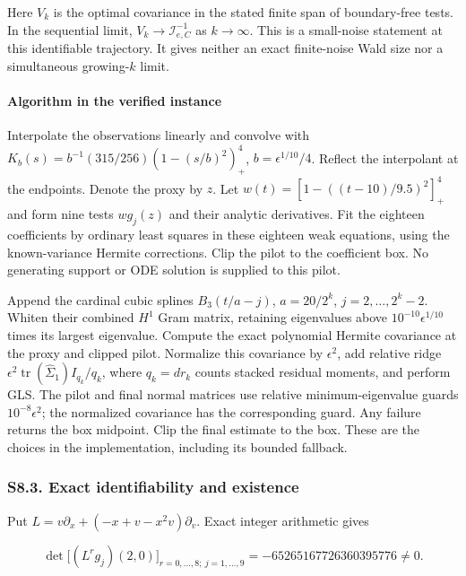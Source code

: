 \documentclass[
  american,
  11pt,
]{article}
\begin{document}
Here \(V_k\) is the optimal covariance in the stated finite span of
boundary-free tests. In the sequential limit,
\(V_k\to\mathcal I_{e,C}^{-1}\) as \(k\to\infty\). This is a small-noise
statement at this identifiable trajectory. It gives neither an exact
finite-noise Wald size nor a simultaneous growing-\(k\) limit.

\paragraph{Algorithm in the verified
instance}\label{algorithm-in-the-verified-instance}

Interpolate the observations linearly and convolve with
\(K_b(s)=b^{-1}(315/256)(1-(s/b)^2)_+^4\), \(b=\epsilon^{1/10}/4\).
Reflect the interpolant at the endpoints. Denote the proxy by \(z\). Let
\(w(t)=[1-((t-10)/9.5)^2]_+^4\) and form nine tests \(w g_j(z)\) and
their analytic derivatives. Fit the eighteen coefficients by ordinary
least squares in these eighteen weak equations, using the known-variance
Hermite corrections. Clip the pilot to the coefficient box. No
generating support or ODE solution is supplied to this pilot.

Append the cardinal cubic splines \(B_3(t/a-j)\), \(a=20/2^k\),
\(j=2,\ldots,2^k-2\). Whiten their combined \(H^1\) Gram matrix,
retaining eigenvalues above \(10^{-10}\epsilon^{1/10}\) times its
largest eigenvalue. Compute the exact polynomial Hermite covariance at
the proxy and clipped pilot. Normalize this covariance by
\(\epsilon^2\), add relative ridge
\(\epsilon^2\operatorname{tr}(\widehat\Sigma_1)I_{q_k}/q_k\), where
\(q_k=d r_k\) counts stacked residual moments, and perform GLS. The
pilot and final normal matrices use relative minimum-eigenvalue guards
\(10^{-8}\epsilon^2\); the normalized covariance has the corresponding
guard. Any failure returns the box midpoint. Clip the final estimate to
the box. These are the choices in the implementation, including its
bounded fallback.

\subsubsection{S8.3. Exact identifiability and
existence}\label{s8.3.-exact-identifiability-and-existence}

Put \(L=v\partial_x+(-x+v-x^2v)\partial_v\). Exact integer arithmetic
gives

\[
\det\big[(L^r g_j)(2,0)\big]_{r=0,\ldots,8;\ j=1,\ldots,9}
=-65265167726360395776\ne0.
\]
\end{document}
